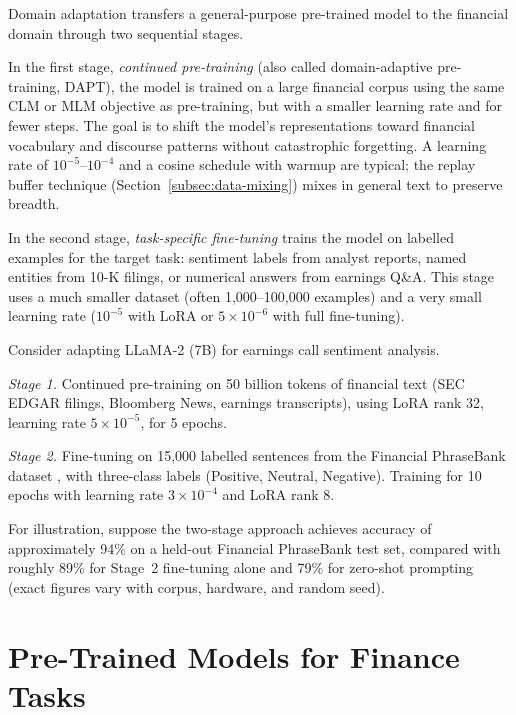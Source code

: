 \begin{deepdive}
Domain adaptation transfers a general-purpose pre-trained model to the
financial domain through two sequential stages.

In the first stage, \emph{continued pre-training} (also called domain-adaptive
pre-training, DAPT), the model is trained on a large financial corpus using the
same CLM or MLM objective as pre-training, but with a smaller learning rate
and for fewer steps.  The goal is to shift the model's representations toward
financial vocabulary and discourse patterns without catastrophic forgetting.
A learning rate of $10^{-5}$--$10^{-4}$ and a cosine schedule with warmup
are typical; the replay buffer technique (Section~\ref{subsec:data-mixing})
mixes in general text to preserve breadth.

In the second stage, \emph{task-specific fine-tuning} trains the model on
labelled examples for the target task: sentiment labels from analyst reports,
named entities from 10-K filings, or numerical answers from earnings Q\&A.
This stage uses a much smaller dataset (often 1{,}000--100{,}000 examples) and
a very small learning rate ($10^{-5}$ with LoRA or $5 \times 10^{-6}$ with
full fine-tuning).

\begin{example}
\label{ex:two-stage-adaptation}
Consider adapting LLaMA-2 (7B) for earnings call sentiment analysis.

\emph{Stage 1.} Continued pre-training on 50 billion tokens of financial text
(SEC EDGAR filings, Bloomberg News, earnings transcripts), using LoRA rank 32,
learning rate $5 \times 10^{-5}$, for 5 epochs.

\emph{Stage 2.} Fine-tuning on 15{,}000 labelled sentences from the Financial
PhraseBank dataset \cite{malo2014financial}, with three-class labels (Positive,
Neutral, Negative).  Training for 10 epochs with learning rate $3 \times 10^{-4}$
and LoRA rank 8.

For illustration, suppose the two-stage approach achieves accuracy of approximately 94\% on a held-out Financial PhraseBank test set, compared with roughly 89\% for Stage~2 fine-tuning alone and 79\% for zero-shot prompting (exact figures vary with corpus, hardware, and random seed).
\end{example}

\end{deepdive}


\section{Pre-Trained Models for Finance Tasks}
\label{sec:finance-models}

